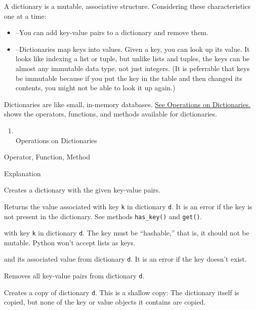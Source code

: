 A dictionary is a mutable,
associative structure. Considering these characteristics one at a time:

\begin{itemize}

\item
   --You can add
  key-value pairs to a dictionary and remove them.
\item
  
  --Dictionaries map keys into values. Given a key, you can look up its
  value. It looks like indexing a list or tuple, but unlike lists and
  tuples, the keys can be almost any immutable data type, not just
  integers. (It is peferrable that keys be immutable because if you put
  the key in the table and then changed its contents, you might not be
  able to look it up again.)
\end{itemize}

Dictionaries are like small,
in-memory databases. \href{chap2.html\#13000}{See Operations on
Dictionaries.} shows the operators, functions, and methods available for
dictionaries.

\begin{enumerate}

\item
  \\
  Operations on Dictionaries
\end{enumerate}

Operator, Function, Method

Explanation



Creates a dictionary with the given
key-value pairs.



Returns the value associated with
key \texttt{k} in dictionary \texttt{d}. It is an error if the key is not
present in the dictionary. See methods \texttt{has\_key()} and
\texttt{get()}.



 with key
\texttt{k} in dictionary \texttt{d}. The key must be ``hashable,'' that is,
it should not be mutable. Python won't accept lists as keys.



 and its
associated value from dictionary \texttt{d}. It is an error if the key
doesn't exist.



Removes all key-value pairs from
dictionary \texttt{d}.



Creates a copy of dictionary
\texttt{d}. This is a shallow copy: The dictionary itself is copied, but
none of the key or value objects it contains are copied.



